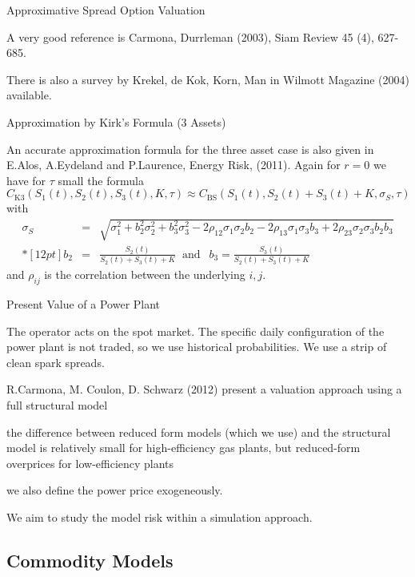 {Approximative Spread Option Valuation}
\item<1-> A very good reference is Carmona, Durrleman (2003), Siam Review 45 (4), 627-685.
\item<2-> There is also a survey by Krekel, de Kok, Korn, Man in Wilmott Magazine (2004) available.

{Approximation by Kirk's Formula (3 Assets)}

An accurate approximation formula for the three asset case is also given in E.Alos, A.Eydeland and P.Laurence, Energy Risk, (2011). Again for $r=0$ we have for  $\tau$ small the formula
{\small
\begin{equation}
 C_{\mbox{K3}}(S_1(t), S_2(t), S_3(t), K, \tau) \approx
 C_{\mbox{BS}}(S_1(t), S_2(t)+S_3(t)+K, \sigma_S, \tau)
\label{kirk3}
\end{equation}
with
 $$
 \begin{array}{lll}
 \sigma_S & = & \sqrt{\sigma_1^2+b_2^2\sigma_2^2 +b_3^2\sigma_3^2
 - 2\rho_{12}\sigma_1\sigma_2b_2 - 2\rho_{13}\sigma_1\sigma_3b_3 + 2\rho_{23}\sigma_2\sigma_3b_2b_3}\\*[12pt]
 b_2 &=& \frac{S_2(t)}{S_2(t)+S_3(t)+ K}
 \;\;\mbox{and}  \;\;\
  b_3 = \frac{S_3(t)}{S_2(t)+S_3(t) + K}
\end{array}$$
}
and $\rho_{ij}$ is the correlation between the underlying $i,j$.

{Present Value of a Power Plant}
\item<1-> The operator acts on the spot market. The specific daily configuration of the power plant is not traded, so we use historical probabilities. We use a strip of clean spark spreads.
\item<2-> R.Carmona, M. Coulon, D. Schwarz (2012)
present a valuation approach using a full structural model
\item the difference between reduced form models (which we use) and the structural model is relatively small for high-efficiency gas plants, but reduced-form overprices for low-efficiency plants
\item we also define the power price exogeneously.
\item<3-> We aim to study the model risk within a simulation approach.

\subsection{Commodity Models}

